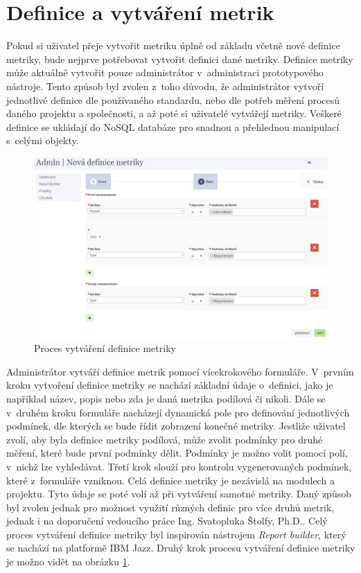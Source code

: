 \documentclass[czech,master]{diploma}
\begin{document}

\section{Definice a vytváření metrik}
\label{sec:definice_a_meriky}
Pokud si uživatel přeje vytvořit metriku úplně od základu včetně nové definice metriky, bude nejprve potřebovat vytvořit definici dané metriky. Definice metriky může aktuálně vytvořit pouze administrátor v~administraci prototypového nástroje. Tento způsob byl zvolen z~toho důvodu, že administrátor vytvoří jednotlivé definice dle používaného standardu, nebo dle potřeb měření procesů daného projektu a společnosti, a až poté si uživatelé vytvářejí metriky. Veškeré definice se ukládají do NoSQL databáze pro snadnou a přehlednou manipulací s~celými objekty.

\begin{figure}[!ht]
    \centering
    \includegraphics[width=1\textwidth]{Diplomka/Figures/report_builder.jpg}
    \caption{Proces vytváření definice metriky}
    \label{fig:report_builder_admin}
\end{figure}

Administrátor vytváří definice metrik pomocí vícekrokového formuláře. V~prvním kroku vytvoření definice metriky se nachází základní údaje o~definici, jako je například název, popis nebo zda je daná metrika podílová či nikoli. Dále se v~druhém kroku formuláře nacházejí dynamická pole pro definování jednotlivých podmínek, dle kterých se bude řídit zobrazení konečné metriky. Jestliže uživatel zvolí, aby byla definice metriky podílová, může zvolit podmínky pro druhé měření, které bude první podmínky dělit. Podmínky je možno volit pomocí polí, v~nichž lze vyhledávat. Třetí krok slouží pro kontrolu vygenerovaných podmínek, které z~formuláře vzniknou. Celá definice metriky je nezávislá na modulech a projektu. Tyto údaje se poté volí až při vytváření samotné metriky. Daný způsob byl zvolen jednak pro možnost využití různých definic pro více druhů metrik, jednak i na doporučení vedoucího práce Ing. Svatopluka Štolfy, Ph.D.. Celý proces vytváření definice metriky byl inspirován nástrojem \textit{Report builder}, který se nachází na platformě IBM Jazz. Druhý krok procesu vytváření definice metriky je možno vidět na obrázku \ref{fig:report_builder_admin}.
\end{document}
